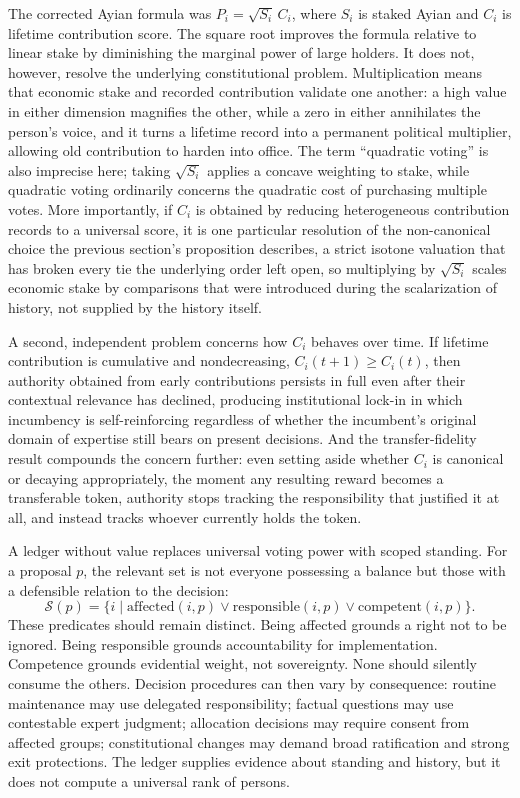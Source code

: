 The corrected Ayian formula was $P_i = \sqrt{S_i}\, C_i$, where $S_i$ is staked Ayian and $C_i$ is lifetime contribution score. The square root improves the formula relative to linear stake by diminishing the marginal power of large holders. It does not, however, resolve the underlying constitutional problem. Multiplication means that economic stake and recorded contribution validate one another: a high value in either dimension magnifies the other, while a zero in either annihilates the person's voice, and it turns a lifetime record into a permanent political multiplier, allowing old contribution to harden into office. The term ``quadratic voting'' is also imprecise here; taking $\sqrt{S_i}$ applies a concave weighting to stake, while quadratic voting ordinarily concerns the quadratic cost of purchasing multiple votes. More importantly, if $C_i$ is obtained by reducing heterogeneous contribution records to a universal score, it is one particular resolution of the non-canonical choice the previous section's proposition describes, a strict isotone valuation that has broken every tie the underlying order left open, so multiplying by $\sqrt{S_i}$ scales economic stake by comparisons that were introduced during the scalarization of history, not supplied by the history itself.

A second, independent problem concerns how $C_i$ behaves over time. If lifetime contribution is cumulative and nondecreasing, $C_i(t+1) \geq C_i(t)$, then authority obtained from early contributions persists in full even after their contextual relevance has declined, producing institutional lock-in in which incumbency is self-reinforcing regardless of whether the incumbent's original domain of expertise still bears on present decisions. And the transfer-fidelity result compounds the concern further: even setting aside whether $C_i$ is canonical or decaying appropriately, the moment any resulting reward becomes a transferable token, authority stops tracking the responsibility that justified it at all, and instead tracks whoever currently holds the token.

A ledger without value replaces universal voting power with scoped standing. For a proposal $p$, the relevant set is not everyone possessing a balance but those with a defensible relation to the decision:
\[
\mathcal{S}(p) = \{ i \mid \mathrm{affected}(i,p) \lor \mathrm{responsible}(i,p) \lor \mathrm{competent}(i,p) \}.
\]
These predicates should remain distinct. Being affected grounds a right not to be ignored. Being responsible grounds accountability for implementation. Competence grounds evidential weight, not sovereignty. None should silently consume the others. Decision procedures can then vary by consequence: routine maintenance may use delegated responsibility; factual questions may use contestable expert judgment; allocation decisions may require consent from affected groups; constitutional changes may demand broad ratification and strong exit protections. The ledger supplies evidence about standing and history, but it does not compute a universal rank of persons.

